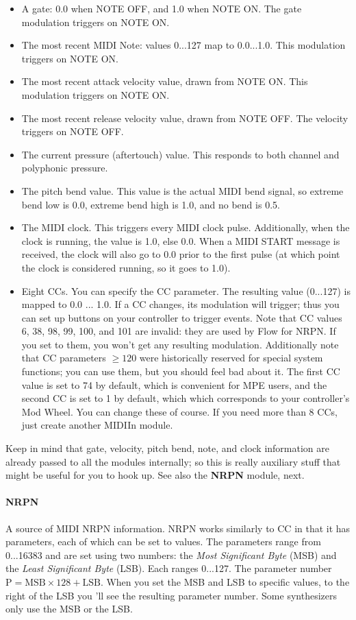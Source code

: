 \documentclass{article}
\newcommand\name{Flow}
\begin{document}
\begin{itemize}
\item A gate: 0.0 when NOTE OFF, and 1.0 when NOTE ON.  The gate modulation triggers on NOTE ON.
\item The most recent MIDI Note: values 0...127 map to 0.0...1.0.  This modulation triggers on NOTE ON.
\item The most recent attack velocity value, drawn from NOTE ON. This modulation triggers on NOTE ON.
\item The most recent release velocity value, drawn from NOTE OFF.  The velocity triggers on NOTE OFF.
\item The current pressure (aftertouch) value.  This responds to both channel and polyphonic pressure.
\item The pitch bend value.  This value is the actual MIDI bend signal, so extreme bend low is 0.0, extreme bend high is 1.0, and no bend is 0.5.
\item The MIDI clock.  This triggers every MIDI clock pulse.  Additionally, when the clock is running, the value is 1.0, else 0.0.  When a MIDI START message is received, the clock will also go to 0.0 prior to the first pulse (at which point the clock is considered running, so it goes to 1.0).
\item Eight CCs.  You can specify the CC parameter.  The resulting value (0...127) is mapped to 0.0 ... 1.0.  If a CC changes, its modulation will trigger; thus you can set up buttons on your controller to trigger events. Note that CC values 6, 38, 98, 99, 100, and 101 are invalid: they are used by {\name} for NRPN.  If you set to them, you won't get any resulting modulation.  Additionally note that CC parameters \(\geq 120\) were historically reserved for special system functions; you can use them, but you should feel bad about it.   The first CC value is set to 74 by default, which is convenient for MPE users, and the second CC is set to 1 by default, which which corresponds to your controller's Mod Wheel.  You can change these of course.  If you need more than 8 CCs, just create another MIDIIn module.
\end{itemize}

Keep in mind that gate, velocity, pitch bend, note, and clock information are already passed to all the modules internally; so this is really auxiliary stuff that might be useful for you to hook up.   See also the {\bf NRPN} module, next.

\paragraph{NRPN}  A source of MIDI NRPN information.  NRPN works similarly to CC in that it has parameters, each of which can be set to values.  The parameters range from 0...16383 and are set using two numbers: the {\it Most Significant Byte} (MSB) and the {\it Least Significant Byte} (LSB).  Each ranges 0...127.  The parameter number \(\text{P} = \text{MSB} \times 128 + \text{LSB}\).  When you set the MSB and LSB to specific values, to the right of the LSB you 'll see the resulting parameter number.  Some synthesizers only use the MSB or the LSB.  
\end{document}

